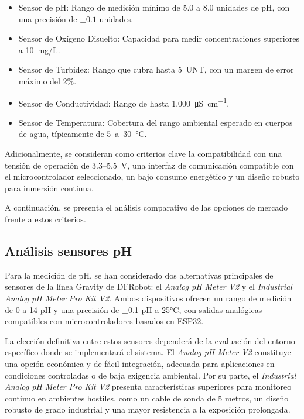 \begin{itemize}
    \item Sensor de pH: Rango de medición mínimo de 5.0 a 8.0 unidades de pH, con una precisión de $\pm0.1$ unidades.
    
    \item Sensor de Oxígeno Disuelto: Capacidad para medir concentraciones superiores a 10~mg/L.
    
    \item Sensor de Turbidez: Rango que cubra hasta 5~UNT, con un margen de error máximo del 2\%.
    
    \item Sensor de Conductividad: Rango de hasta 1{,}000~\si{\micro\siemens\per\centi\meter}.
    
    \item Sensor de Temperatura: Cobertura del rango ambiental esperado en cuerpos de agua, típicamente de 5~a~30~\si{\celsius}.
\end{itemize}

Adicionalmente, se consideran como criterios clave la compatibilidad con una tensión de operación de 3.3--5.5~V, una interfaz de comunicación compatible con el microcontrolador seleccionado, un bajo consumo energético y un diseño robusto para inmersión continua. 

A continuación, se presenta el análisis comparativo de las opciones de mercado frente a estos criterios.



\subsection{Análisis sensores pH}

Para la medición de pH, se han considerado dos alternativas principales de sensores de la línea Gravity de DFRobot: el \textit{Analog pH Meter V2} y el \textit{Industrial Analog pH Meter Pro Kit V2}. Ambos dispositivos ofrecen un rango de medición de 0 a 14 pH y una precisión de $\pm$0.1 pH a 25°C, con salidas analógicas compatibles con microcontroladores basados en ESP32.

La elección definitiva entre estos sensores dependerá de la evaluación del entorno específico donde se implementará el sistema. El \textit{Analog pH Meter V2} constituye una opción económica y de fácil integración, adecuada para aplicaciones en condiciones controladas o de baja exigencia ambiental. Por su parte, el \textit{Industrial Analog pH Meter Pro Kit V2} presenta características superiores para monitoreo continuo en ambientes hostiles, como un cable de sonda de 5 metros, un diseño robusto de grado industrial y una mayor resistencia a la exposición prolongada.

